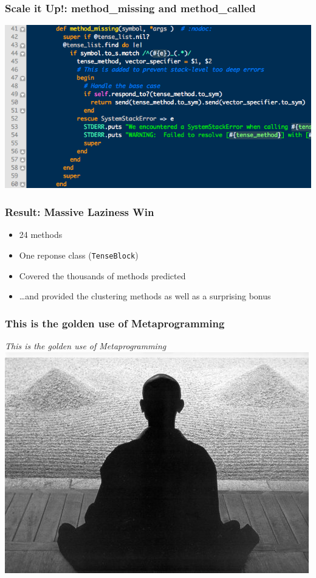 \documentclass[slidestop,compress,mathserif]{beamer}
\begin{document}
\begin{frame}
	\frametitle{Scale it Up!: method\_missing and method\_called}
	\includegraphics[scale=0.45]{img/lv_mm.png}	
\end{frame}

\begin{frame}
	\frametitle{Result:  Massive Laziness Win}
	\begin{itemize}
		\item 24 methods
		\item One reponse class (\texttt{TenseBlock})
		\item Covered the thousands of methods predicted
		\item \ldots and provided the clustering methods as well as a surprising bonus
	\end{itemize}
\end{frame}

\begin{frame}
	\frametitle{This is the golden use of Metaprogramming}
	\begin{center}
		\emph{This is the golden use of Metaprogramming}
		\includegraphics[scale=0.45]{img/Zen04.jpg}	
	\end{center}
\end{frame}
\end{document}
